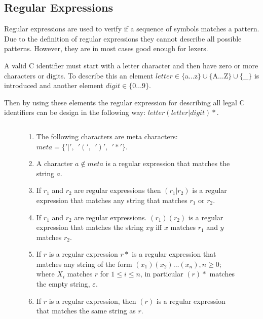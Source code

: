\subsection{Regular Expressions}
Regular expressions are used to verify if a sequence of symbols matches a
pattern. Due to the definition of regular expressions they cannot describe all
possible patterns. However, they are in most cases good enough for lexers.
\newline
\begin{example}\label{regexpEx}
A valid C identifier must start with a letter character and then have zero or more characters or digits. To describe this an element $letter
\in \{$a$ \dots $z$\} \cup \{$A$ \dots $Z$\} \cup \{$\_$\}$ is introduced and
another element $digit \in \{0 \dots 9\}$.

Then by using these elements the regular expression for describing all legal C
identifiers can be design in the following way: $letter (letter | digit)*$.
\end{example}
\newpage
\begin{figure}[ht!]
\begin{definition}\label{regexp} $ $\\
\begin{enumerate}
  \item The following characters are meta characters: $meta = \{ '|', ~~ '(', ~~ ')', ~~ '*' \}$.
  \item A character $a \notin meta$ is a regular expression that matches the 
      string $a$.
  \item If $r_1$ and $r_2$ are regular expressions then $(r_1 | r_2)$ is a 
      regular expression that matches any string that matches $r_1$ or $r_2$.
  \item If $r_1$ and $r_2$ are regular expressions. $(r_1)(r_2)$ is a regular
      expression that matches the string $xy$ iff $x$ matches $r_1$
      and $y$ matches $r_2$.
  \item If $r$ is a regular expression $r*$ is a regular expression that
      matches any string of the form $(x_1)(x_2) \dots  (x_n), n \geq 0$;
      where $X_i$ matches $r$ for $1 \leq i \leq n$, in particular $(r)*$ 
      matches the empty string, $\varepsilon$.
  \item If $r$ is a regular expression, then $(r)$ is a regular expression that
      matches the same string as $r$.
\end{enumerate}
\qeda
\end{definition}
\end{figure}

